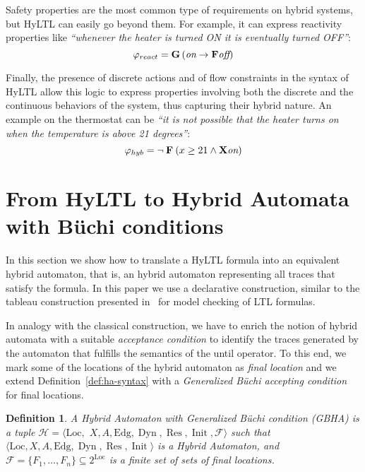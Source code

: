 \documentclass[submission,copyright,creativecommons]{eptcs}
\newcommand{\hyltl}{\textsf{HyLTL}\xspace}
\newcommand{\ltl}{\textsf{LTL}\xspace}
\newcommand{\X}{\ensuremath{\mathbin{\mathbf{X}}}\xspace}
\newcommand{\F}{\ensuremath{\mathbin{\mathbf{F}}}\xspace}
\newcommand{\G}{\ensuremath{\mathbin{\mathbf{G}}}\xspace}
\newcommand{\on}{\text{\it on}}
\newcommand{\off}{\text{\it off}}
\newtheorem{definition}{Definition}
\newcommand{\cvF}{\mathcal{F}}
\newcommand{\autH}{\mathcal{H}}
\newcommand{\Loc}{\mathrm{Loc}}
\newcommand{\Edg}{\mathrm{Edg}}
\DeclareMathOperator{\Dyn}{{Dyn}}
\DeclareMathOperator{\Res}{{Res}}
\DeclareMathOperator{\Init}{{Init}}
\renewcommand{\quote}[1]{\emph{``#1''}}
\begin{document}
\noindent Safety properties are the most common type of requirements on hybrid systems, but \hyltl can easily go beyond them. For example, it can express reactivity properties like \quote{whenever the heater is turned ON it is eventually turned OFF}:
\begin{equation}
	\varphi_{react} = \G \left( \on \rightarrow \F \off \right)
\end{equation}

\noindent Finally, the presence of discrete actions and of flow constraints in the syntax of \hyltl allow this logic to express properties involving both the discrete and the continuous behaviors of the system, thus capturing their hybrid nature. An example on the thermostat can be \quote{it is not possible that the heater turns on when the temperature is above 21 degrees}:
\begin{equation}
	\varphi_{hyb} = \neg \F \left( x \geq 21 \land \X \on \right)
\end{equation}






\section{From \hyltl to Hybrid Automata with B\"uchi conditions}

In this section we show how to translate a \hyltl formula into an equivalent hybrid automaton, that is, an hybrid automaton representing all traces that satisfy the formula. In this paper we use a declarative construction, similar to the tableau construction presented in~\cite{mcbook} for model checking of \ltl formulas. 

In analogy with the classical construction, we have to enrich the notion of hybrid automata with a suitable \emph{acceptance condition} to identify the traces generated by the automaton that fulfills the semantics of the until operator. To this end, we mark some of the locations of the hybrid automaton as \emph{final location} and we extend Definition~\ref{def:ha-syntax} with a \emph{Generalized B\"uchi accepting condition} for final locations.

\begin{definition}\label{def:ha-buechi}
 A \emph{Hybrid Automaton with Generalized B\"uchi condition (GBHA)} is a tuple $\autH=\langle\Loc,$ $X,A,\Edg,\Dyn,\Res,\Init,\cvF\rangle$ such that $\langle\Loc,X,A,\Edg,\Dyn,\Res,\Init\rangle$ is a Hybrid Automaton, and  \linebreak $\cvF = \{F_1, \ldots, F_n\} \subseteq 2^{\Loc}$ is a finite set of sets of final locations.
\end{definition}
\end{document}
